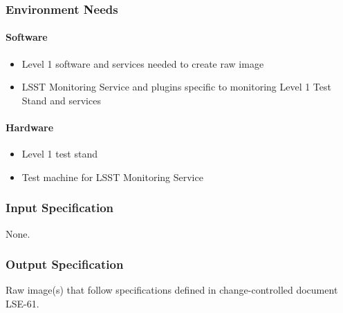 \subsubsection{Environment Needs}

\paragraph{Software}
\begin{itemize}
\tightlist
\item
  Level 1 software and services needed to create raw image
\item
  LSST Monitoring Service and plugins specific to monitoring Level 1
  Test Stand and services
\end{itemize}


\paragraph{Hardware}
\begin{itemize}
\tightlist
\item
  Level 1 test stand
\item
  Test machine for LSST Monitoring Service
\end{itemize}


\subsubsection{Input Specification}
None.


\subsubsection{Output Specification}
Raw image(s) that follow specifications defined in change-controlled
document LSE-61.


